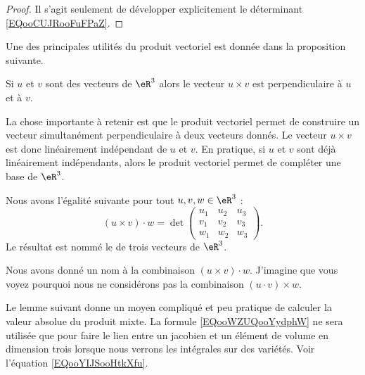 \begin{proof}
    Il s'agit seulement de développer explicitement le déterminant \eqref{EQooCUJRooFuFPaZ}.
\end{proof}

Une des principales utilités du produit vectoriel est donnée dans la proposition suivante.
\begin{proposition}     \label{PROPooIQMTooFHNjfu}
    Si \( u\) et \( v\) sont des vecteurs de \( \eR^3\) alors le vecteur \( u\times v\) est perpendiculaire à \( u\) et à \( v\).
\end{proposition}
La chose importante à retenir est que le produit vectoriel permet de construire un vecteur simultanément perpendiculaire à deux vecteurs donnés. Le vecteur $u\times v$ est donc linéairement indépendant de $u$ et $v$. En pratique, si $u$ et $v$ sont déjà linéairement indépendants, alors le produit vectoriel permet de compléter une base de $\eR^3$.

\begin{lemmaDef}
    Nous avons l'égalité suivante pour tout \( u,v,w\in \eR^3\) :
    \begin{equation}        \label{EQooKJYUooSQgfXU}
        (u\times v)\cdot w=\det\begin{pmatrix}
                u_1	&	u_2	&	u_3	\\
                v_1	&	v_2	&	v_3	\\
                w_1	&	w_2	&	w_3
        \end{pmatrix}.
    \end{equation}
    Le résultat est nommé le  de trois vecteurs de \( \eR^3\).
\end{lemmaDef}

\begin{normaltext}
    Nous avons donné un nom à la combinaison \( (u\times v)\cdot w\). J'imagine que vous voyez pourquoi nous ne considérons pas la combinaison $(u\cdot v)\times w$.
\end{normaltext}

Le lemme suivant donne un moyen compliqué et peu pratique de calculer la valeur absolue du produit mixte. La formule \eqref{EQooWZUQooYydphW} ne sera utilisée que pour faire le lien entre un jacobien et un élément de volume en dimension trois lorsque nous verrons les intégrales sur des variétés. Voir l'équation \eqref{EQooYIJSooHtkXfu}. 

